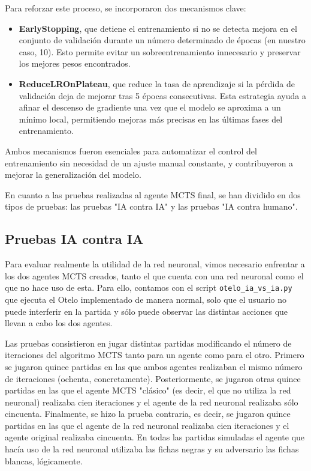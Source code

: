 \documentclass[conference]{IEEEtran}
\begin{document}
Para reforzar este proceso, se incorporaron dos mecanismos clave:

\begin{itemize}
    \item \textbf{EarlyStopping}, que detiene el entrenamiento si no se detecta mejora en el conjunto de validación durante un número determinado de épocas (en nuestro caso, 10). Esto permite evitar un sobreentrenamiento innecesario y preservar los mejores pesos encontrados.
    \item \textbf{ReduceLROnPlateau}, que reduce la tasa de aprendizaje si la pérdida de validación deja de mejorar tras 5 épocas consecutivas. Esta estrategia ayuda a afinar el descenso de gradiente una vez que el modelo se aproxima a un mínimo local, permitiendo mejoras más precisas en las últimas fases del entrenamiento.
\end{itemize}

Ambos mecanismos fueron esenciales para automatizar el control del entrenamiento sin necesidad de un ajuste manual constante, y contribuyeron a mejorar la generalización del modelo.

En cuanto a las pruebas realizadas al agente MCTS final, se han dividido en dos tipos de pruebas: las pruebas "IA contra IA" y las pruebas "IA contra humano".

\subsection{Pruebas IA contra IA}
Para evaluar realmente la utilidad de la red neuronal, vimos necesario enfrentar a los dos agentes MCTS creados, tanto el que cuenta con una red neuronal como el que no hace uso de esta. Para ello, contamos con el script \texttt{otelo\_ia\_vs\_ia.py} que ejecuta el Otelo implementado de manera normal, solo que el usuario no puede interferir en la partida y sólo puede observar las distintas acciones que llevan a cabo los dos agentes.

Las pruebas consistieron en jugar distintas partidas modificando el número de iteraciones del algoritmo MCTS tanto para un agente como para el otro. Primero se jugaron quince partidas en las que ambos agentes realizaban el mismo número de iteraciones (ochenta, concretamente). Posteriormente, se jugaron otras quince partidas en las que el agente MCTS "clásico" (es decir, el que no utiliza la red neuronal) realizaba cien iteraciones y el agente de la red neuronal realizaba sólo cincuenta. Finalmente, se hizo la prueba contraria, es decir, se jugaron quince partidas en las que el agente de la red neuronal realizaba cien iteraciones y el agente original realizaba cincuenta. En todas las partidas simuladas el agente que hacía uso de la red neuronal utilizaba las fichas negras y su adversario las fichas blancas, lógicamente.
\end{document}
